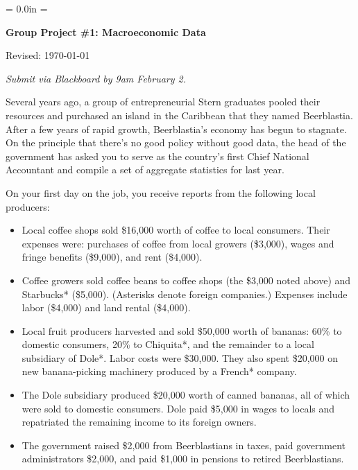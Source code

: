 \documentclass[12pt]{exam}
\def\HeadName{Group Project \#1}
\begin{document}
\parindent = 0.0in
\parskip = \bigskipamount
\thispagestyle{empty}%
\Head

\centerline{\large \bf \HeadName: Macroeconomic Data} 
\centerline{Revised:  \today}

\medskip
{\it Submit via Blackboard by 9am February 2.}

\begin{questions}
Several years ago,
a group of entrepreneurial Stern graduates pooled their resources and
purchased an island in the Caribbean that they named Beerblastia.
After a few years of rapid growth, Beerblastia's economy has begun
to stagnate.  On the principle that there's no good policy without
good data, the head of the government has asked you to serve as
the country's first Chief National Accountant and compile a
set of aggregate statistics for last year.

On your first day on the job, you receive reports 
from the following local producers:  
%
\begin{itemize}
\item Local coffee shops sold \$16,000 %
worth of coffee to local consumers. 
Their expenses were:  
purchases of coffee from local growers (\$3,000), 
wages and fringe benefits (\$9,000), %
and rent (\$4,000).

\item Coffee growers sold coffee beans to 
coffee shops (the \$3,000 noted above) and Starbucks* (\$5,000).
(Asterisks denote foreign companies.) 
Expenses include labor (\$4,000) and land rental (\$4,000).

\item Local fruit producers harvested and sold 
\$50,000 worth of bananas: 
60\% to domestic consumers, 20\% to Chiquita*, 
and the remainder to a local subsidiary of Dole*. 
Labor costs were \$30,000.  
They also spent \$20,000 on new banana-picking machinery
produced by a French* company.  

\item The Dole subsidiary produced \$20,000
worth of canned bananas, all of which were sold to domestic
consumers. Dole paid \$5,000 in wages to locals and repatriated
the remaining income to its foreign owners.  

\item The government raised \$2,000 from Beerblastians in taxes, 
paid government administrators \$2,000, 
and paid \$1,000 in pensions to retired Beerblastians.  


\end{itemize}
\end{questions}
\end{document}
